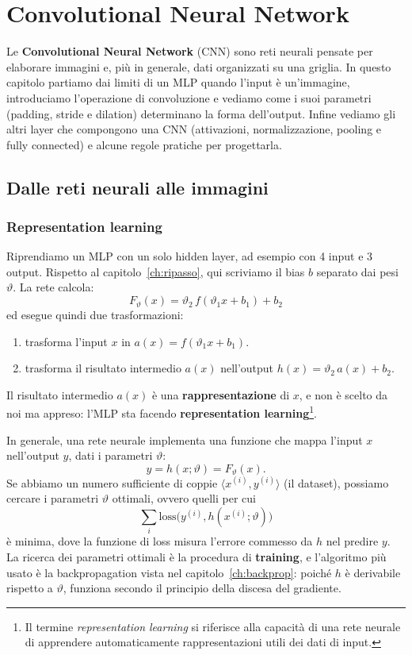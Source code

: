 \chapter{Convolutional Neural Network}\label{ch:cnn}
Le \textbf{Convolutional Neural Network} (CNN) sono reti neurali pensate per elaborare immagini e, più in generale, dati organizzati su una griglia. In questo capitolo partiamo dai limiti di un MLP quando l'input è un'immagine, introduciamo l'operazione di convoluzione e vediamo come i suoi parametri (padding, stride e dilation) determinano la forma dell'output. Infine vediamo gli altri layer che compongono una CNN (attivazioni, normalizzazione, pooling e fully connected) e alcune regole pratiche per progettarla.

\section{Dalle reti neurali alle immagini}
\subsection{Representation learning}
Riprendiamo un MLP con un solo hidden layer, ad esempio con 4 input e 3 output. Rispetto al capitolo~\ref{ch:ripasso}, qui scriviamo il bias $b$ separato dai pesi $\vartheta$. La rete calcola:
\[
F_\vartheta(x) = \vartheta_2\, f(\vartheta_1 x + b_1) + b_2
\]
ed esegue quindi due trasformazioni:
\begin{enumerate}
    \item trasforma l'input $x$ in $a(x) = f(\vartheta_1 x + b_1)$.
    \item trasforma il risultato intermedio $a(x)$ nell'output $h(x) = \vartheta_2\, a(x) + b_2$.
\end{enumerate}
Il risultato intermedio $a(x)$ è una \textbf{rappresentazione} di $x$, e non è scelto da noi ma appreso: l'MLP sta facendo \textbf{representation learning}\footnote{Il termine \textit{representation learning} si riferisce alla capacità di una rete neurale di apprendere automaticamente rappresentazioni utili dei dati di input.}.

In generale, una rete neurale implementa una funzione che mappa l'input $x$ nell'output $y$, dati i parametri $\vartheta$:
\[
y = h(x; \vartheta) = F_\vartheta(x).
\]
Se abbiamo un numero sufficiente di coppie $\langle x^{(i)}, y^{(i)}\rangle$ (il dataset), possiamo cercare i parametri $\vartheta$ ottimali, ovvero quelli per cui
\[
\sum_i \mathrm{loss}\big(y^{(i)}, h(x^{(i)}; \vartheta)\big)
\]
è minima, dove la funzione di loss misura l'errore commesso da $h$ nel predire $y$. La ricerca dei parametri ottimali è la procedura di \textbf{training}, e l'algoritmo più usato è la backpropagation vista nel capitolo~\ref{ch:backprop}: poiché $h$ è derivabile rispetto a $\vartheta$, funziona secondo il principio della discesa del gradiente.

